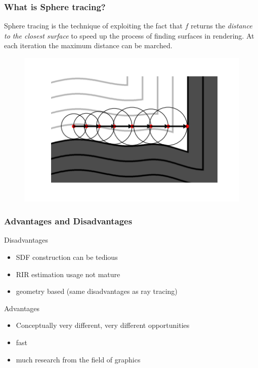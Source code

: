 \documentclass[aspectratio=169]{beamer}
\begin{document}
\begin{frame}
\frametitle{What is Sphere tracing?}

Sphere tracing is the technique of exploiting the fact that $f$ returns the \textit{distance to the closest surface} to speed up the process of finding surfaces in rendering. At each iteration the maximum distance can be marched.

\begin{figure}
\includegraphics[scale=0.5]{../paper/DAFx20_Templates_LaTeX/img/sphereTracingViz.png}
\end{figure}
\end{frame}

\begin{frame}
\frametitle{Advantages and Disadvantages}
Disadvantages
\begin{itemize}
\item SDF construction can be tedious
\item RIR estimation usage not mature
\item geometry based (same disadvantages as ray tracing)
\end{itemize}
Advantages
\begin{itemize}
\item Conceptually very different, very different opportunities
\item fast
\item much research from the field of graphics
\end{itemize}
\end{frame}
\end{document}
